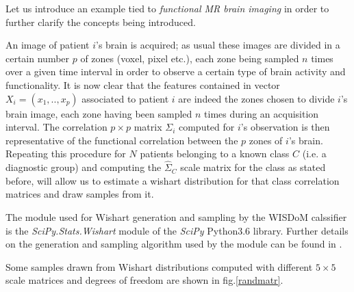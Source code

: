 \documentclass[12pt,openright,twoside,a4paper]{book}
\begin{document}
Let us introduce an example tied to \textit{functional MR brain imaging } in order to further clarify the concepts being introduced. 

An image of patient $i$'s brain is acquired; as usual these images are divided in a certain number $p$ of zones (voxel, pixel etc.), each zone being sampled $n$ times over a given time interval in order to observe a certain type of brain activity and functionality.
It is now clear that the features contained in vector $X_i=(x_1,..,x_p)$ associated to patient $i$ are indeed the zones chosen to divide $i$'s brain image, each zone having been sampled $n$ times during an acquisition interval.
The correlation $p \times p$ matrix $\Sigma_i$ computed for $i$'s observation is then representative of the functional correlation between the $p$ zones of $i$'s brain.
Repeating this procedure for $N$ patients belonging to a known class $C$ (i.e. a diagnostic group) and computing the $\hat{\Sigma}_C$ scale matrix for the class as stated before, will allow us to estimate a wishart distribution for that class correlation matrices and draw samples from it.

The module used for Wishart generation and sampling by the WISDoM calssifier is the \textit{SciPy.Stats.Wishart} module of the \textit{SciPy} Python3.6 library.
Further details on the generation and sampling algorithm used  by the module can be found in \cite{WishGen}.

Some  samples drawn from Wishart distributions computed with different  $5 \times 5$ scale matrices and degrees of freedom are shown in fig.\ref{randmatr}.

\clearpage
\end{document}
